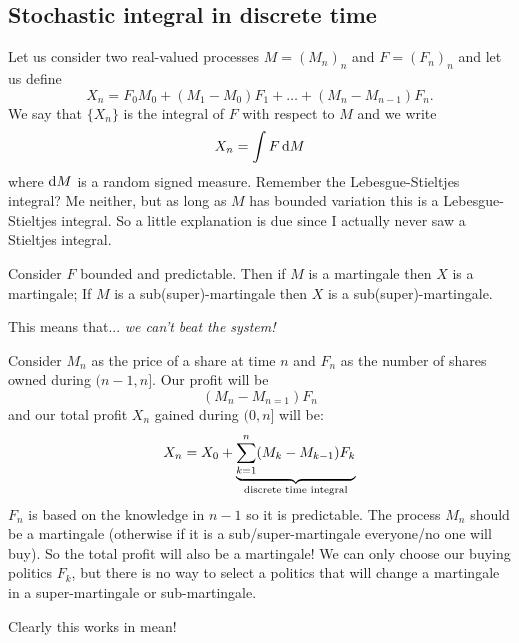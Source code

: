 \documentclass{report}
\begin{document}
\subsection{Stochastic integral in discrete time}
Let us consider two real-valued processes $M={(M_{n})}_{n}$ and $F={(F_{n})}_{n}$ and let us define
\[X_{n}=F_0M_{0}+(M_1-M_0)F_1+\ldots+(M_{n}-M_{n-1})F_n.\]
We say that $\{X_{n}\}$ is the integral of $F$ with respect to $M$ and we write
\[X_{n}=\int F \mathop{}\!\mathrm{d} M\]
where $\mathop{}\!\mathrm{d} M$ is a random signed measure. Remember the Lebesgue-Stieltjes integral? Me neither, but as long as $M$ has bounded variation this is a Lebesgue-Stieltjes integral. So a little explanation is due since I actually never saw a Stieltjes integral.
\begin{theorem}
	Consider $F$ bounded and predictable. Then if $M$ is a martingale then $X$ is a martingale; If $M$ is a sub(super)-martingale then $X$ is a sub(super)-martingale.
\end{theorem}
This means that... \emph{we can't beat the system!}
\begin{flushright}
	\hspace*{2.5cm}
\end{flushright}
\begin{example}
	Consider $M_{n}$ as the price of a share at time $n$ and $F_{n}$ as the number of shares owned during $(n-1,n]$. Our profit will be 
	\[(M_{n}-M_{n=1})F_{n}\]
	and our total profit $X_{n}$ gained during $(0,n]$ will be:
	\[X_{n}=X_{0}+\underbrace{\sum_{k=1}^{n}(M_{k}-M_{k-1})F_{k}}_{\mathclap{\text{discrete time integral}}}\]
	$F_{n}$ is based on the knowledge in $n-1$ so it is predictable. The process $M_{n}$ should be a martingale (otherwise if it is a sub/super-martingale everyone/no one will buy). So the total profit will also be a martingale! We can only choose our buying politics $F_{k}$, but there is no way to select a politics that will change a martingale in a super-martingale or sub-martingale.
\end{example}
Clearly this works in mean! 
\end{document}

